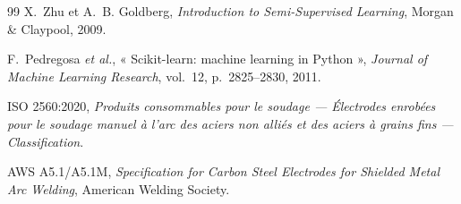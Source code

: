\begin{thebibliography}{99}
X.~Zhu et A.~B. Goldberg, \emph{Introduction to Semi-Supervised Learning}, Morgan \&
Claypool, 2009.

F.~Pedregosa \emph{et al.}, « Scikit-learn: machine learning in Python », \emph{Journal of
Machine Learning Research}, vol.~12, p.~2825--2830, 2011.

ISO 2560:2020, \emph{Produits consommables pour le soudage --- Électrodes enrobées pour
le soudage manuel à l'arc des aciers non alliés et des aciers à grains fins ---
Classification}.

AWS A5.1/A5.1M, \emph{Specification for Carbon Steel Electrodes for Shielded Metal Arc
Welding}, American Welding Society.

\end{thebibliography}

